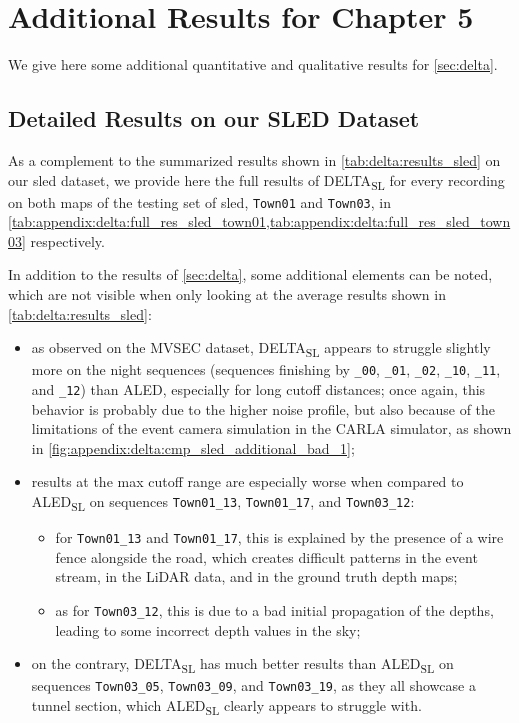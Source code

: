 \chapter{Additional Results for Chapter 5}
We give here some additional quantitative and qualitative results for \cref{sec:delta}.

\section{Detailed Results on our SLED Dataset}\label{sec:appendix:delta:sled_full}
As a complement to the summarized results shown in \cref{tab:delta:results_sled} on our \acrshort{sled} dataset, we provide here the full results of DELTA\textsubscript{SL} for every recording on both maps of the testing set of \acrshort{sled}, \verb|Town01| and \verb|Town03|, in \cref{tab:appendix:delta:full_res_sled_town01,tab:appendix:delta:full_res_sled_town03} respectively.

In addition to the results of \cref{sec:delta}, some additional elements can be noted, which are not visible when only looking at the average results shown in \cref{tab:delta:results_sled}:
\begin{itemize}\small
  \item as observed on the MVSEC dataset, DELTA\textsubscript{SL} appears to struggle slightly more on the night sequences (sequences finishing by \verb|_00|, \verb|_01|, \verb|_02|, \verb|_10|, \verb|_11|, and \verb|_12|) than ALED, especially for long cutoff distances; once again, this behavior is probably due to the higher noise profile, but also because of the limitations of the event camera simulation in the CARLA simulator, as shown in \cref{fig:appendix:delta:cmp_sled_additional_bad_1};
  \item results at the max cutoff range are especially worse when compared to ALED\textsubscript{SL} on sequences \verb|Town01_13|, \verb|Town01_17|, and \verb|Town03_12|:
  \begin{itemize}
    \item for \verb|Town01_13| and \verb|Town01_17|, this is explained by the presence of a wire fence alongside the road, which creates difficult patterns in the event stream, in the LiDAR data, and in the ground truth depth maps;
    \item as for \verb|Town03_12|, this is due to a bad initial propagation of the depths, leading to some incorrect depth values in the sky; 
  \end{itemize}
  \item on the contrary, DELTA\textsubscript{SL} has much better results than ALED\textsubscript{SL} on sequences \verb|Town03_05|, \verb|Town03_09|, and \verb|Town03_19|, as they all showcase a tunnel section, which ALED\textsubscript{SL} clearly appears to struggle with.
\end{itemize}


